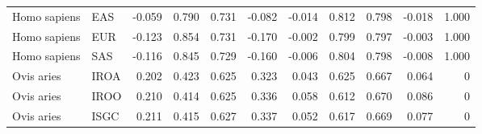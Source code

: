 \begin{longtable}{llrrrrrrrrr}
        Homo sapiens &                       EAS &                             -0.059 &                               0.790 &                 0.731 &                -0.082 &                             -0.014 &                               0.812 &                 0.798 &                -0.018 &         1.000 \\
        Homo sapiens &                       EUR &                             -0.123 &                               0.854 &                 0.731 &                -0.170 &                             -0.002 &                               0.799 &                 0.797 &                -0.003 &         1.000 \\
        Homo sapiens &                       SAS &                             -0.116 &                               0.845 &                 0.729 &                -0.160 &                             -0.006 &                               0.804 &                 0.798 &                -0.008 &         1.000 \\
          Ovis aries &                      IROA &                              0.202 &                               0.423 &                 0.625 &                 0.323 &                              0.043 &                               0.625 &                 0.667 &                 0.064 &             0 \\
          Ovis aries &                      IROO &                              0.210 &                               0.414 &                 0.625 &                 0.336 &                              0.058 &                               0.612 &                 0.670 &                 0.086 &             0 \\
          Ovis aries &                      ISGC &                              0.211 &                               0.415 &                 0.627 &                 0.337 &                              0.052 &                               0.617 &                 0.669 &                 0.077 &             0 \\
\end{longtable}
